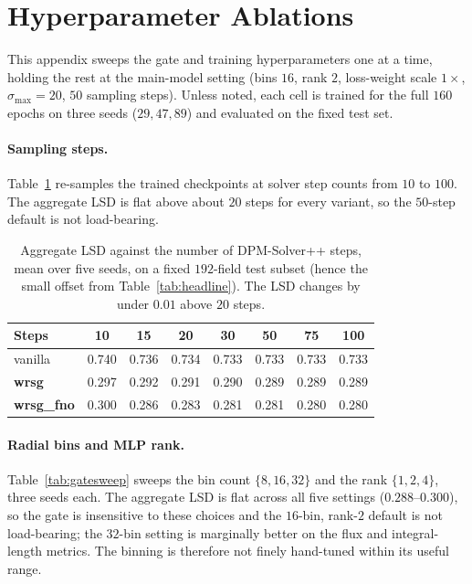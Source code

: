 \documentclass[10pt]{article} %
\begin{document}
\section{Hyperparameter Ablations}
\label{app:ablations}

This appendix sweeps the gate and training hyperparameters one at a time, holding the rest at the main-model setting (bins $16$, rank $2$, loss-weight scale $1\times$, $\sigma_{\max}=20$, $50$ sampling steps). Unless noted, each cell is trained for the full $160$ epochs on three seeds ($29, 47, 89$) and evaluated on the fixed test set.

\paragraph{Sampling steps.} Table~\ref{tab:steps} re-samples the trained checkpoints at solver step counts from $10$ to $100$. The aggregate LSD is flat above about $20$ steps for every variant, so the $50$-step default is not load-bearing.

\begin{table}[H]
\centering
\caption{Aggregate LSD against the number of DPM-Solver++ steps, mean over five seeds, on a fixed $192$-field test subset (hence the small offset from Table~\ref{tab:headline}). The LSD changes by under $0.01$ above $20$ steps.}
\label{tab:steps}
\begin{tabular}{lccccccc}
\toprule
Steps & 10 & 15 & 20 & 30 & 50 & 75 & 100 \\
\midrule
vanilla            & 0.740 & 0.736 & 0.734 & 0.733 & 0.733 & 0.733 & 0.733 \\
\textbf{wrsg}      & 0.297 & 0.292 & 0.291 & 0.290 & 0.289 & 0.289 & 0.289 \\
\textbf{wrsg\_fno} & 0.300 & 0.286 & 0.283 & 0.281 & 0.281 & 0.280 & 0.280 \\
\bottomrule
\end{tabular}
\end{table}

\paragraph{Radial bins and MLP rank.} Table~\ref{tab:gatesweep} sweeps the bin count $\{8,16,32\}$ and the rank $\{1,2,4\}$, three seeds each. The aggregate LSD is flat across all five settings ($0.288$--$0.300$), so the gate is insensitive to these choices and the $16$-bin, rank-$2$ default is not load-bearing; the $32$-bin setting is marginally better on the flux and integral-length metrics. The binning is therefore not finely hand-tuned within its useful range.
\end{document}
